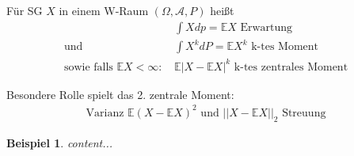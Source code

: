 \documentclass[]{article}
\newtheorem*{example}{Beispiel}
\begin{document}
Für SG $X$ in einem W-Raum $(\Omega, \mathcal{A}, P)$ heißt
\begin{align*}
	&\int X dp = \mathbb{E} X \text{ Erwartung}\\
	\text{und } &\int X^k dP = \mathbb{E}X^k \text{ k-tes Moment}\\
	\text{sowie falls } \mathbb{E}X < \infty \text{: } &\mathbb{E}|X-\mathbb{E}X|^k \text{ k-tes zentrales Moment}
\end{align*}

Besondere Rolle spielt das 2. zentrale Moment: 
\begin{align*}
	\text{Varianz } \mathbb{E}(X-\mathbb{E}X)^2 \text{ und } ||X-\mathbb{E}X||_2 \text{ Streuung}
\end{align*}

\begin{example}
	content...
\end{example}
\end{document}
